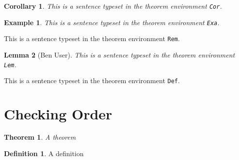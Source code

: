 \documentclass{article}
\theoremstyle{break} \newtheorem{Cor}{Corollary}
\theoremstyle{plain} \newtheorem{Exa}{Example}[section]
\theoremstyle{marginbreak} \newtheorem{Lem}[Cor]{Lemma}
\theoremstyle{change}
\newtheorem{theorem}{Theorem}[section]
\theoremstyle{definition}
\newtheorem{definition}{Definition}[section]
\begin{document}
\begin{Cor}
This is a sentence typeset in the theorem environment \texttt{Cor}.
\end{Cor}

\begin{Exa}
This is a sentence typeset in the theorem environment \texttt{Exa}.
\end{Exa}

\begin{Rem}
This is a sentence typeset in the theorem environment \texttt{Rem}.
\end{Rem}

\begin{Lem}[Ben User]
This is a sentence typeset in the theorem environment \texttt{Lem}.
\end{Lem}

\begin{Def}
This is a sentence typeset in the theorem environment \texttt{Def}.
\end{Def}

\section{Checking Order}
\begin{theorem}
  A theorem
\end{theorem}
\begin{definition}
  A definition
\end{definition}
\end{document}
